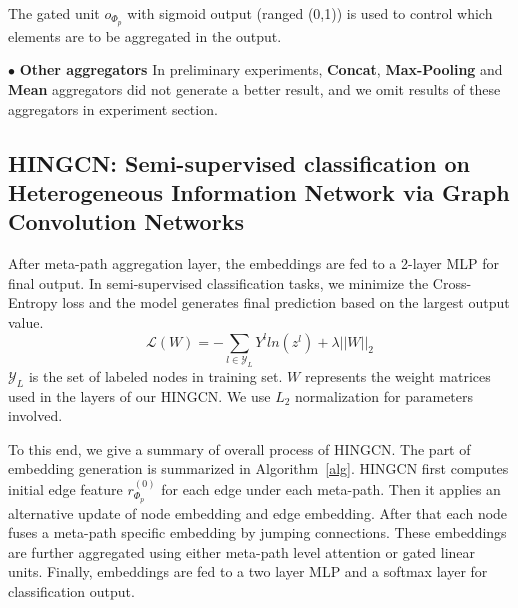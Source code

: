 The gated unit $o_{\Phi_p}$ with sigmoid output (ranged (0,1)) is used to control which elements are to be aggregated in the output. 
 
$\bullet$ \textbf{Other aggregators}
In preliminary experiments, \textbf{Concat}, \textbf{Max-Pooling} and \textbf{Mean} aggregators did not generate a better result, and we omit results of these aggregators in experiment section.

\subsection{HINGCN: Semi-supervised classification on Heterogeneous Information Network via Graph Convolution Networks}
After meta-path aggregation layer, the embeddings are fed to a 2-layer MLP for final output. In semi-supervised classification tasks, we minimize the Cross-Entropy loss and the model generates final prediction based on the largest output value.
\begin{equation}
\label{eq:loss}
\mathcal{L}(W)=   - \sum_{l\in \mathcal{Y}_L}Y^l ln(z^l)   + \lambda || W ||_2
\end{equation}
$ \mathcal{Y}_L$ is the set of labeled nodes in training set. $W$ represents the weight matrices used in the layers of our HINGCN. We use $L_2$ normalization for parameters involved.

To this end, we give a summary of overall process of HINGCN.
The part of embedding generation is summarized in Algorithm~\ref{alg}.
HINGCN first computes initial edge feature $r^{(0)}_{\Phi_p}$ for each edge under each meta-path. Then it applies an alternative update of node embedding and edge embedding.
After that each node fuses a meta-path specific embedding by jumping connections. These embeddings are further aggregated using either meta-path level attention or gated linear units. Finally, embeddings are fed to a two layer MLP and a softmax layer for classification output.

